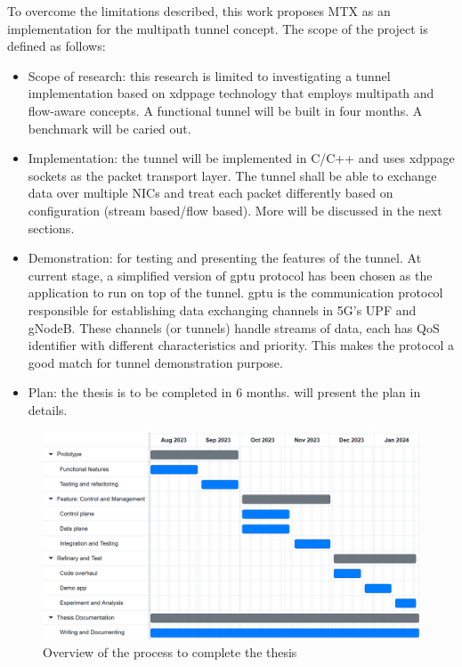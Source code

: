 To overcome the limitations described, this work proposes MTX as an implementation for the multipath tunnel concept.
The scope of the project is defined as follows:
\begin{itemize}
    \item Scope of research: this research is limited to investigating a tunnel implementation based on \ac{xdppage} technology that employs multipath and flow-aware concepts. 
    A functional tunnel will be built in four months.
    A benchmark will be caried out.
    \item Implementation: the tunnel will be implemented in C/C++ and uses \ac{xdppage} sockets as the packet transport layer. 
    The tunnel shall be able to exchange data over multiple \ac{NIC}s and treat each packet differently based on configuration (stream based/flow based). 
    More will be discussed in the next sections.
    \item Demonstration: for testing and presenting the features of the tunnel. 
    At current stage, a simplified version of \ac{gptu} protocol has been chosen as the application to run on top of the tunnel. 
    \ac{gptu} is the communication protocol responsible for establishing data exchanging channels in 5G's \ac{UPF} and gNodeB. 
    These channels (or tunnels) handle streams of data, each has \ac{QoS} identifier with different characteristics and priority. This makes the protocol a good match for tunnel demonstration purpose.
    \item Plan: the thesis is to be completed in 6 months.  will present the plan in details.
\end{itemize}

\begin{figure}[H]
	\centering
	\includegraphics[width=1.0\textwidth]{resources/images/mini_gannt.PNG}
	\caption{Overview of the process to complete the thesis}
    \label{fig:introduction:mini_gannt}
\end{figure}

